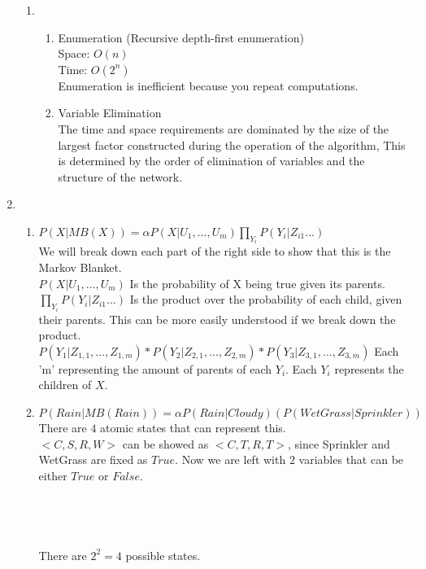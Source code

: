 \documentclass[12pt,a4paper]{report}
\begin{document}
\begin{enumerate}
\begin{enumerate}
\item
\begin{enumerate}
\item
Enumeration (Recursive depth-first enumeration)\\
Space: $O(n)$\\
Time: $O(2^n)$\\
Enumeration is inefficient because you repeat computations.\\
\item
Variable Elimination\\
The time and space requirements are dominated by the size of the largest factor constructed during the operation of the algorithm, This is determined by the order of elimination of variables and the structure of the network.\\
\end{enumerate}

\end{enumerate}

\pagebreak
\item
\begin{enumerate}
	\item
	$P(X|MB(X)) = \alpha P(X|U_1, ... , U_m)\prod_{Y_{i}}P(Y_i|Z_{i1}...)$\\
	We will break down each part of the right side to show that this is the Markov Blanket.\\
	$P(X|U_1, ... , U_m)$ Is the probability of X being true given its parents.\\
	$\prod_{Y_{i}}P(Y_i|Z_{i1}...)$ Is the product over the probability of each child, given their parents. This can be more easily understood if we break down the product.\\
	$P(Y_1|Z_{1,1}, ... , Z_{1,m})*P(Y_2|Z_{2,1}, ... ,Z_{2,m})*P(Y_3|Z_{3,1}, ... , Z_{3,m})$ Each 'm' representing the amount of parents of each $Y_i$. Each $Y_i$ represents the children of $X$.\\
	
	\item
	$P(Rain|MB(Rain)) = \alpha P(Rain|Cloudy)(P(WetGrass|Sprinkler))$\\
	There are $4$ atomic states that can represent this.\\
	$<C,S,R,W>$ can be showed as $<C,T,R,T>$, since Sprinkler and WetGrass are fixed as $True$. Now we are left with $2$ variables that can be either $True$ or $False$.\\
	\\
	\\
	\\
	\\
	There are $2^2 = 4$ possible states.\\
	

\end{enumerate}
\end{enumerate}
\end{document}
